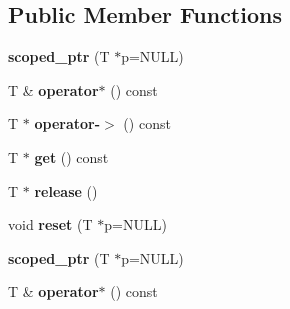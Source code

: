 \subsection*{Public Member Functions}
\begin{DoxyCompactItemize}
\item 
\hypertarget{classtesting_1_1internal_1_1scoped__ptr_adb972432999a0c63720df148964ac2a5}{}{\bfseries scoped\+\_\+ptr} (T $\ast$p=N\+U\+L\+L)\label{classtesting_1_1internal_1_1scoped__ptr_adb972432999a0c63720df148964ac2a5}

\item 
\hypertarget{classtesting_1_1internal_1_1scoped__ptr_ab197837f87062de69d9d6e04539bbabe}{}T \& {\bfseries operator$\ast$} () const \label{classtesting_1_1internal_1_1scoped__ptr_ab197837f87062de69d9d6e04539bbabe}

\item 
\hypertarget{classtesting_1_1internal_1_1scoped__ptr_adc38310fbbe400faf9279e36000a17c4}{}T $\ast$ {\bfseries operator-\/$>$} () const \label{classtesting_1_1internal_1_1scoped__ptr_adc38310fbbe400faf9279e36000a17c4}

\item 
\hypertarget{classtesting_1_1internal_1_1scoped__ptr_adc8f8fcb63ce69f80f011456e6d2f08d}{}T $\ast$ {\bfseries get} () const \label{classtesting_1_1internal_1_1scoped__ptr_adc8f8fcb63ce69f80f011456e6d2f08d}

\item 
\hypertarget{classtesting_1_1internal_1_1scoped__ptr_a7a4f3e568d81a5d8bcb5f8d6bf5130b1}{}T $\ast$ {\bfseries release} ()\label{classtesting_1_1internal_1_1scoped__ptr_a7a4f3e568d81a5d8bcb5f8d6bf5130b1}

\item 
\hypertarget{classtesting_1_1internal_1_1scoped__ptr_acac03266a43359801aff0de5c990bec0}{}void {\bfseries reset} (T $\ast$p=N\+U\+L\+L)\label{classtesting_1_1internal_1_1scoped__ptr_acac03266a43359801aff0de5c990bec0}

\item 
\hypertarget{classtesting_1_1internal_1_1scoped__ptr_adb972432999a0c63720df148964ac2a5}{}{\bfseries scoped\+\_\+ptr} (T $\ast$p=N\+U\+L\+L)\label{classtesting_1_1internal_1_1scoped__ptr_adb972432999a0c63720df148964ac2a5}

\item 
\hypertarget{classtesting_1_1internal_1_1scoped__ptr_ab197837f87062de69d9d6e04539bbabe}{}T \& {\bfseries operator$\ast$} () const \label{classtesting_1_1internal_1_1scoped__ptr_ab197837f87062de69d9d6e04539bbabe}


\end{DoxyCompactItemize}
